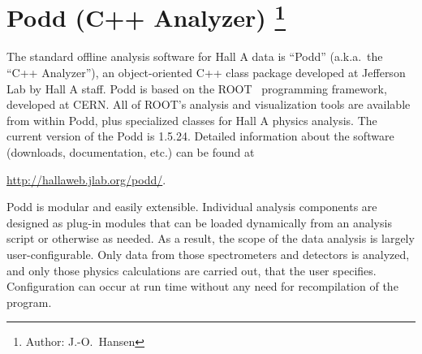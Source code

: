 
\newcommand{\cppaver}{1.5.24}

\chapter[Podd (C++ Analyzer)]{Podd (C++ Analyzer)
\footnote{Author: J.-O.\ Hansen }
}

The standard offline analysis software for Hall A data is ``Podd'' 
(a.k.a.\ the ``C++ Analyzer''), 
an object-oriented C++ class package developed at
Jefferson Lab by Hall A staff. Podd is based on the
ROOT~\cite{ROOTcern} programming framework, developed at CERN.
All of ROOT's analysis and visualization tools are available from within Podd,
plus specialized classes for Hall A physics analysis. 
The current version of the Podd is \cppaver. Detailed information about the
software (downloads, documentation, etc.) can be found at
\begin{center}
  \url{http://hallaweb.jlab.org/podd/}.
\end{center}

Podd is modular and easily extensible.
Individual analysis components are designed as plug-in modules
that can be loaded dynamically from an analysis script or otherwise as needed. 
As a result, the scope of the data analysis is 
largely user-configurable. Only data from those spectrometers and 
detectors is analyzed, and only those physics calculations are carried out,
that the user specifies. Configuration can occur at run 
time without any need for recompilation of the program.

